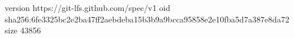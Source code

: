 version https://git-lfs.github.com/spec/v1
oid sha256:6fe3325bc2e2ba47ff2aebdeba15b3b9a9bcca95858e2e10fba5d7a387e8da72
size 43856
